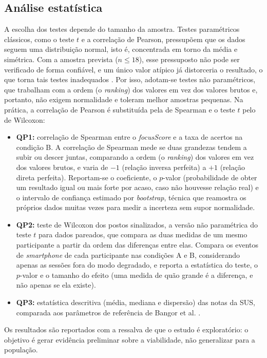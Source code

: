 \documentclass[12pt,a4paper]{article}
\begin{document}
\subsection{Análise estatística}
A escolha dos testes depende do tamanho da amostra. Testes paramétricos clássicos, como o teste $t$ e a correlação de Pearson, pressupõem que os dados seguem uma distribuição normal, isto é, concentrada em torno da média e simétrica. Com a amostra prevista ($n \leq 18$), esse pressuposto não pode ser verificado de forma confiável, e um único valor atípico já distorceria o resultado, o que torna tais testes inadequados \cite{Fie13}. Por isso, adotam-se testes não paramétricos, que trabalham com a ordem (o \emph{ranking}) dos valores em vez dos valores brutos e, portanto, não exigem normalidade e toleram melhor amostras pequenas. Na prática, a correlação de Pearson é substituída pela de Spearman e o teste $t$ pelo de Wilcoxon:
\begin{itemize}[leftmargin=*]
  \item \textbf{QP1:} correlação de Spearman entre o \emph{focusScore} e a taxa de acertos na condição B. A correlação de Spearman mede se duas grandezas tendem a subir ou descer juntas, comparando a ordem (o \emph{ranking}) dos valores em vez dos valores brutos, e varia de $-1$ (relação inversa perfeita) a $+1$ (relação direta perfeita). Reportam-se o coeficiente, o $p$-valor (probabilidade de obter um resultado igual ou mais forte por acaso, caso não houvesse relação real) e o intervalo de confiança estimado por \emph{bootstrap}, técnica que reamostra os próprios dados muitas vezes para medir a incerteza sem supor normalidade.
  \item \textbf{QP2:} teste de Wilcoxon dos postos sinalizados, a versão não paramétrica do teste $t$ para dados pareados, que compara as duas medidas de um mesmo participante a partir da ordem das diferenças entre elas. Compara os eventos de \emph{smartphone} de cada participante nas condições A e B, considerando apenas as sessões fora do modo degradado, e reporta a estatística do teste, o $p$-valor e o tamanho do efeito (uma medida de quão grande é a diferença, e não apenas se ela existe).
  \item \textbf{QP3:} estatística descritiva (média, mediana e dispersão) das notas da SUS, comparada aos parâmetros de referência de Bangor et al. \cite{BKM08}.
\end{itemize}
Os resultados são reportados com a ressalva de que o estudo é exploratório: o objetivo é gerar evidência preliminar sobre a viabilidade, não generalizar para a população.
\end{document}
